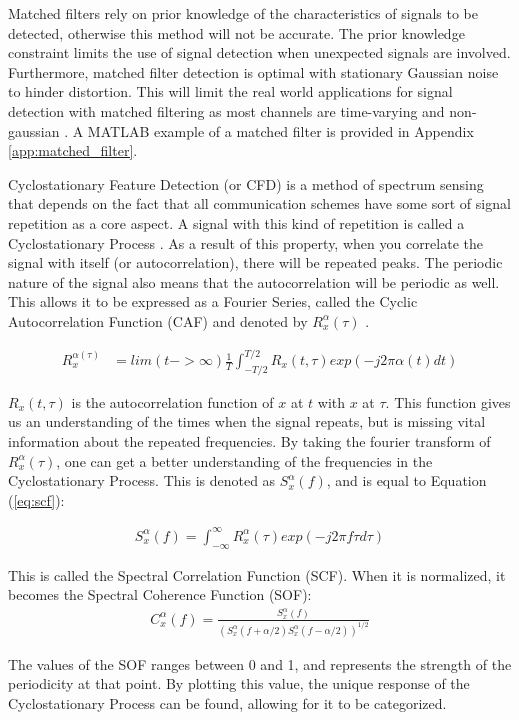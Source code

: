 Matched filters rely on prior knowledge of the characteristics of signals to be detected, otherwise this method will not be accurate. The prior knowledge constraint limits the use of signal detection when unexpected signals are involved. Furthermore, matched filter detection is optimal with stationary Gaussian noise to hinder distortion. This will limit the real world applications for signal detection with matched filtering as most channels are time-varying and non-gaussian \cite{channel_fade}. A MATLAB example of a matched filter is provided in Appendix \ref{app:matched_filter}. \par
Cyclostationary Feature Detection (or CFD) is a method of spectrum sensing that depends on the fact that all communication schemes have some sort of signal repetition as a core aspect. A signal with this kind of repetition is called a Cyclostationary Process \cite{cyclostat_journal}. As a result of this property, when you correlate the signal with itself (or autocorrelation), there will be repeated peaks. The periodic nature of the signal also means that the autocorrelation will be periodic as well. This allows it to be expressed as a Fourier Series, called the Cyclic Autocorrelation Function (CAF) and denoted by $R_x^\alpha(\tau)$ \cite{cyclostat_text}.\par 

\begin{align}\label{eq:scf}
    R_x^{\alpha(\tau)} &= lim(t->\infty) \frac{1}{T} \int_{-T/2}^{T/2} R_x(t,\tau)exp(-j2\pi\alpha(t) dt)
\end{align}

$R_x(t,\tau)$ is the autocorrelation function of $x$ at $t$ with $x$ at $\tau$. This function gives us an understanding of the times when the signal repeats, but is missing vital information about the repeated frequencies. By taking the fourier transform of $R_x^\alpha(\tau)$, one can get a better understanding of the frequencies in the Cyclostationary Process. This is denoted as $S_x^\alpha(f)$, and is equal to Equation (\ref{eq:scf}):

\begin{align}\label{eq:scf}
S_x^\alpha(f)=\int_{-\infty}^{\infty} R_x^\alpha(\tau)exp(-j2\pi f\tau d\tau) 
\end{align}
\par

This is called the Spectral Correlation Function (SCF). When it is normalized, it becomes the Spectral Coherence Function (SOF):
\begin{align}
C_x^\alpha(f) = \frac{ S_x^\alpha(f)}{ (S_x^\alpha(f+\alpha/2) S_x^\alpha(f-\alpha/2))^{1/2}} \label{eq:caf}
\end{align} \par
The values of the SOF ranges between 0 and 1, and represents the strength of the periodicity at that point. By plotting this value, the unique response of the Cyclostationary Process can be found, allowing for it to be categorized.\par


